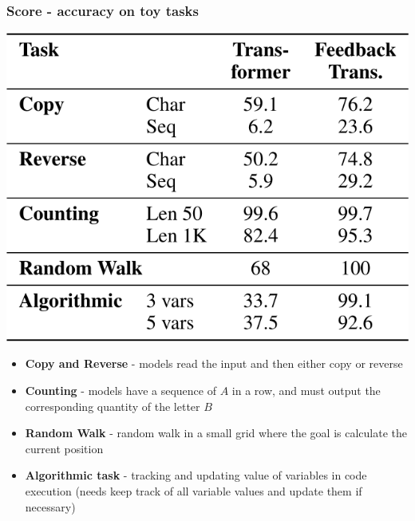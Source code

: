 \documentclass{beamer}
\begin{document}
\begin{frame}
    \frametitle{Score - accuracy on toy tasks}
    \begin{center}
        \includegraphics[scale=0.18]{img/feedback_transformer_copy_reverse.png}
    \end{center}
    \begin{itemize}
        \item \scriptsize{\textbf{Copy and Reverse} - models read the input and then either copy or reverse}
        \item \textbf{Counting} - models have a sequence of $A$ in a row, and must output the corresponding quantity of the letter $B$
        \item \textbf{Random Walk} - random walk in a small grid where the goal is calculate the current position
        \item \textbf{Algorithmic task} - tracking and updating value of variables in code execution (needs keep track of all variable values and update them if necessary)
    \end{itemize}
\end{frame}
\end{document}
